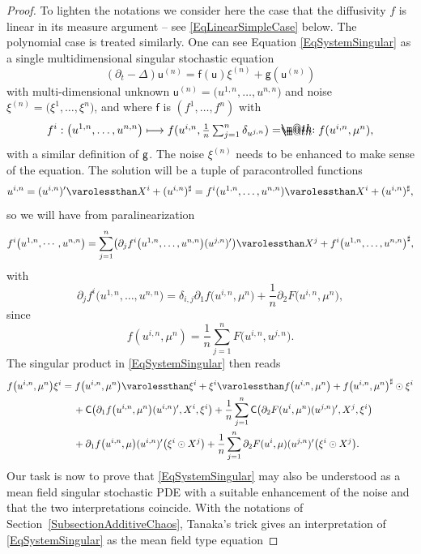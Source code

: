 \documentclass[10pt]{amsart}
\makeatletter
\newcommand\mto{\mathchoice{\longmapsto}{\mapsto}{\mapsto}{\mapsto}}
\theoremstyle{definition}
\newcommand*{\eqdef}{=\mathrel{\rlap{%
\raisebox{0.3ex}{$\m@th\cdot$}}%
\raisebox{-0.3ex}{$\m@th\cdot$}}%
}
\makeatother
\begin{document}
\begin{proof}
To lighten the notations we consider here the case that the diffusivity $f$ is linear in its measure argument -- see \eqref{EqLinearSimpleCase} below. The polynomial case is treated similarly. One can see Equation \eqref{EqSystemSingular} as a single multidimensional singular stochastic equation
\[
(\partial_t-\Delta)\mathsf{u}^{(n)} = \mathsf{f}(\mathsf{u})\xi^{(n)} + \mathsf{g}(\mathsf{u}^{(n)})
\]
with multi-dimensional unknown $\mathsf{u}^{(n)} = \bigl(u^{1,n},\dots,u^{n,n}\bigr)$ and noise $\xi^{(n)} = \bigl(\xi^1,\dots,\xi^n\bigr)$, and where $\mathsf{f}$ is $(f^1,\dots,f^n)$ with
\[
f^i : \bigl(u^{1,n},\dots,u^{n,n}\bigr)\mto \textstyle f(u^{i,n},\frac{1}{n}\sum_{j=1}^n\delta_{u^{j,n}}) \eqdef f(u^{i,n},\mu^n),
\]
with a similar definition of $\sf g$. The noise $\xi^{(n)}$ needs to be enhanced to make sense of the equation. The solution will be a tuple of paracontrolled functions
\[
u^{i,n} = (u^{i,n})' \varolessthan X^i + (u^{i,n})^\sharp = f^i(u^{1,n},\dots,u^{n,n}) \varolessthan X^i + (u^{i,n})^\sharp,
\]
so we will have from paralinearization
\[
f^i\bigl(u^{1,n},\cdots,u^{n,n} \bigr) = \sum_{j=1}^n \bigl(\partial_j f^i\bigl(u^{1,n},\dots,u^{n,n}\bigr)(u^{j,n})'\bigr) \varolessthan X^j + f^i\bigl(u^{1,n},\dots,u^{n,n}\bigr)^\sharp,
\]
with
\[
\partial_j f^i\bigl(u^{1,n},\dots,u^{n,n}\bigr)=\delta_{i,j}\partial_1 f\bigl(u^{i,n},\mu^n\bigr) + \frac{1}{n} \partial_2 F\bigl(u^{i,n},\mu^n\bigr),
\]
since
\begin{equation} \label{EqLinearSimpleCase}
f(u^{i,n}, \mu^n) = \frac{1}{n}\sum_{j=1}^n F\bigl(u^{i,n},u^{j,n}\bigr).
\end{equation}
The singular product in \eqref{EqSystemSingular} then reads
\begin{align} \label{EqFormulation1}
f\bigl(u^{i,n},\mu^n\bigr) &\xi^i = f\bigl(u^{i,n},\mu^n\bigr) \varolessthan \xi^i + \xi^i\varolessthan f\bigl(u^{i,n},\mu^n\bigr)+ f\bigl(u^{i,n},\mu^n\bigr)^\sharp\odot\xi^i\notag
\\
&\qquad+\mathsf{C}\bigl( \partial_1 f\bigl(u^{i,n},\mu^n\bigr)(u^{i,n})', X^i, \xi^i\bigr) + \frac{1}{n}\sum_{j=1}^n \mathsf{C}\bigl(\partial_2 F(u^i,\mu^n)(u^{j,n})', X^j, \xi^i \bigr)
\\
&\qquad + \partial_1 f\bigl(u^{i,n},\mu\bigr)(u^{i,n})' \bigl(\xi^i\odot X^j\bigr) + \frac{1}{n}\sum_{j=1}^n \partial_2 F(u^i,\mu)(u^{j,n})' \bigl(\xi^i \odot X^j\bigr).\notag
\end{align}
Our task is now to prove that \eqref{EqSystemSingular} may also be understood as a mean field singular stochastic PDE with a suitable enhancement of the noise and that the two interpretations coincide. With the notations of Section~\ref{SubsectionAdditiveChaos}, Tanaka's trick gives an interpretation of \eqref{EqSystemSingular} as the mean field type equation

\end{proof}
\end{document}
